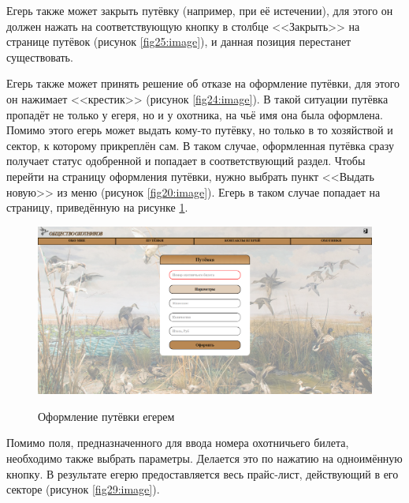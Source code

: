 	Егерь также может закрыть путёвку (например, при её истечении), для этого он должен нажать на соответствующую кнопку в столбце <<Закрыть>> на странице путёвок (рисунок \ref{fig25:image}), и данная позиция перестанет существовать.
	
	Егерь также может принять решение об отказе на оформление путёвки, для этого он нажимает <<крестик>> (рисунок \ref{fig24:image}). В такой ситуации путёвка пропадёт не только у егеря, но и у охотника, на чьё имя она была оформлена.\\

	Помимо этого егерь может выдать кому-то путёвку, но только в то хозяйствой и сектор, к которому прикреплён сам. В таком случае, оформленная путёвка сразу получает статус одобренной и попадает в соответствующий раздел. Чтобы перейти на страницу оформления путёвки, нужно выбрать пункт <<Выдать новую>> из меню (рисунок \ref{fig20:image}). Егерь в таком случае попадает на страницу, приведённую на рисунке \ref{fig28:image}.

	\begin{figure}[h]
		\centering
		\begin{center}
			{\includegraphics[scale=0.34]{schemes/screens/create_huntsman.png}}
			\caption{Оформление путёвки егерем}
			\label{fig28:image}
		\end{center}
	\end{figure}
	\newpage

	Помимо поля, предназначенного для ввода номера охотничьего билета, необходимо также выбрать параметры. Делается это по нажатию на одноимённую кнопку. В результате егерю предоставляется весь прайс-лист, действующий в его секторе (рисунок \ref{fig29:image}).
	
